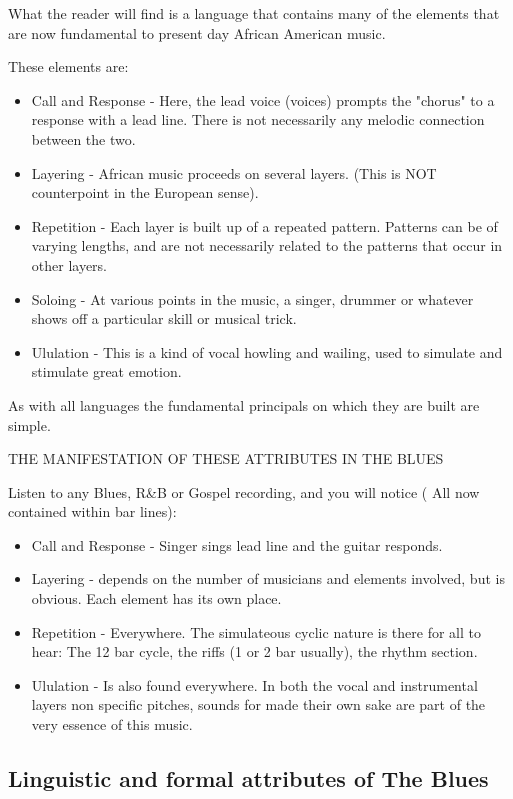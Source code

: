 \documentclass{article}
\begin{document}
What the reader will find is a language that contains many of the elements that are now fundamental to present day African American music.

These elements are:

\begin{itemize}
    \item Call and Response - Here, the lead voice (voices) prompts the "chorus"  to a response with a lead line.
        There is not necessarily any melodic connection between the two.
    \item Layering - African music proceeds on several layers.
        (This is NOT counterpoint in the European sense).
    \item Repetition - Each layer is built up of a repeated pattern.
        Patterns can be of varying lengths, and are not necessarily related to the patterns that occur in other layers.
    \item Soloing - At various points in the music, a singer, drummer or whatever shows off a particular skill or musical trick.
    \item Ululation - This is a kind of vocal howling and wailing, used to simulate and stimulate great emotion.
\end{itemize}

As with all languages the fundamental principals on which they are built are simple.

THE MANIFESTATION OF THESE ATTRIBUTES IN THE BLUES

Listen to any Blues, R\&B or Gospel recording, and you will notice ( All now contained within bar lines):

\begin{itemize}
    \item Call and Response - Singer sings lead line and the guitar responds.
    \item Layering - depends on the number of musicians and elements involved, but is obvious.
        Each element has its own place.
    \item Repetition - Everywhere.
        The simulateous cyclic nature is there for all to hear: The 12 bar cycle, the riffs (1 or 2 bar usually), the rhythm section.
    \item Ululation - Is also found everywhere.
        In both the vocal and instrumental layers non specific pitches, sounds for made their own sake are part of the very essence of this music.
\end{itemize}

\subsection{Linguistic and formal attributes of The Blues}
\end{document}
